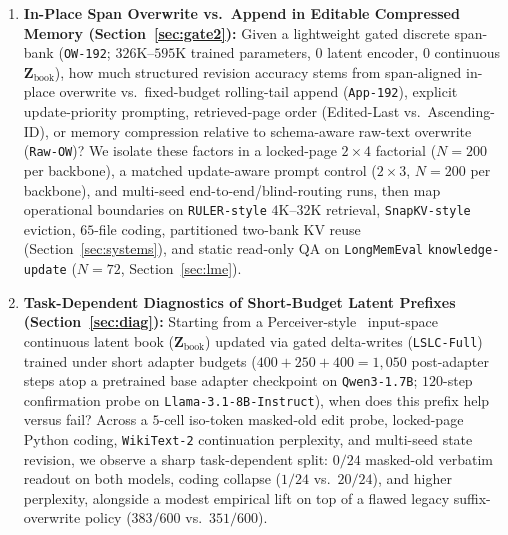\documentclass[11pt]{article}
\newcommand{\vect}[1]{\mathbf{#1}}
\renewcommand{\_}{\origunderscore\allowbreak}
\begin{document}
\begin{enumerate}
    \item \textbf{In-Place Span Overwrite vs.\ Append in Editable Compressed Memory (Section~\ref{sec:gate2}):} Given a lightweight gated discrete span-bank (\texttt{OW-192}; $326\text{K}$--$595\text{K}$ trained parameters, $0$ latent encoder, $0$ continuous $\vect{Z}_{\text{book}}$), how much structured revision accuracy stems from span-aligned in-place overwrite vs.\ fixed-budget rolling-tail append (\texttt{App-192}), explicit update-priority prompting, retrieved-page order (Edited-Last vs.\ Ascending-ID), or memory compression relative to schema-aware raw-text overwrite (\texttt{Raw-OW})? We isolate these factors in a locked-page $2\times 4$ factorial ($N=200$ per backbone), a matched update-aware prompt control ($2\times 3$, $N=200$ per backbone), and multi-seed end-to-end/blind-routing runs, then map operational boundaries on \texttt{RULER-style} $4\text{K}$--$32\text{K}$ retrieval, \texttt{SnapKV-style} eviction, $65$-file coding, partitioned two-bank KV reuse (Section~\ref{sec:systems}), and static read-only QA on \texttt{LongMemEval} \texttt{knowledge-update} ($N=72$, Section~\ref{sec:lme}).
    \item \textbf{Task-Dependent Diagnostics of Short-Budget Latent Prefixes (Section~\ref{sec:diag}):} Starting from a Perceiver-style~\cite{jaegle2021perceiver} input-space continuous latent book ($\vect{Z}_{\text{book}}$) updated via gated delta-writes (\texttt{LSLC-Full}) trained under short adapter budgets ($400+250+400 = 1{,}050$ post-adapter steps atop a pretrained base adapter checkpoint on \texttt{Qwen3-1.7B}; $120$-step confirmation probe on \texttt{Llama-3.1-8B-Instruct}), when does this prefix help versus fail? Across a $5$-cell iso-token masked-old edit probe, locked-page Python coding, \texttt{WikiText-2} continuation perplexity, and multi-seed state revision, we observe a sharp task-dependent split: $0/24$ masked-old verbatim readout on both models, coding collapse ($1/24$ vs.\ $20/24$), and higher perplexity, alongside a modest empirical lift on top of a flawed legacy suffix-overwrite policy ($383/600$ vs.\ $351/600$).
\end{enumerate}
\end{document}
